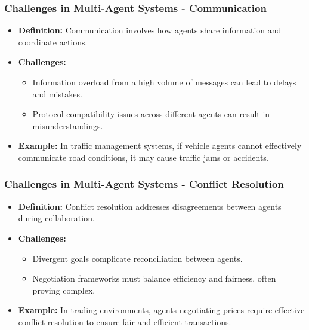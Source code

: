\documentclass[aspectratio=169]{beamer}
\begin{document}
\begin{frame}[fragile]
    \frametitle{Challenges in Multi-Agent Systems - Communication}
    \begin{itemize}
        \item \textbf{Definition:} Communication involves how agents share information and coordinate actions.
        \item \textbf{Challenges:}
        \begin{itemize}
            \item Information overload from a high volume of messages can lead to delays and mistakes.
            \item Protocol compatibility issues across different agents can result in misunderstandings.
        \end{itemize}
        \item \textbf{Example:} In traffic management systems, if vehicle agents cannot effectively communicate road conditions, it may cause traffic jams or accidents.
    \end{itemize}
\end{frame}

\begin{frame}[fragile]
    \frametitle{Challenges in Multi-Agent Systems - Conflict Resolution}
    \begin{itemize}
        \item \textbf{Definition:} Conflict resolution addresses disagreements between agents during collaboration.
        \item \textbf{Challenges:}
        \begin{itemize}
            \item Divergent goals complicate reconciliation between agents.
            \item Negotiation frameworks must balance efficiency and fairness, often proving complex.
        \end{itemize}
        \item \textbf{Example:} In trading environments, agents negotiating prices require effective conflict resolution to ensure fair and efficient transactions.
    \end{itemize}
\end{frame}
\end{document}
